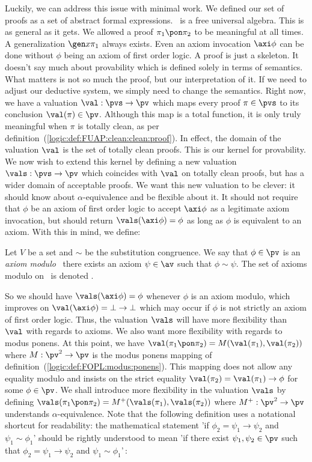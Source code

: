 Luckily, we can address this issue with minimal work. We defined our
set of proofs as a set of abstract formal expressions. \pvs\ is a
free universal algebra. This is as general as it gets. We allowed a
proof $\pi_{1}\pon\pi_{2}$ to be meaningful at all times. A
generalization $\gen x\pi_{1}$ always exists. Even an axiom
invocation $\axi\phi$ can be done without $\phi$ being an axiom of
first order logic. A proof is just a skeleton. It doesn't say much
about provability which is defined solely in terms of semantics.
What matters is not so much the proof, but our interpretation of it.
If we need to adjust our deductive system, we simply need to change
the semantics. Right now, we have a valuation $\val:\pvs\to\pv$
which maps every proof $\pi\in\pvs$ to its conclusion
$\val(\pi)\in\pv$. Although this map is a total function, it is only
truly meaningful when $\pi$ is totally clean, as per
definition~(\ref{logic:def:FUAP:clean:clean:proof}). In effect, the
domain of the valuation $\val$ is the set of totally clean proofs.
This is our kernel for provability. We now wish to extend this
kernel by defining a new valuation $\vals:\pvs\to\pv$ which
coincides with $\val$ on totally clean proofs, but has a wider
domain of acceptable proofs. We want this new valuation to be
clever: it should know about $\alpha$-equivalence and be flexible
about it. It should not require that $\phi$ be an axiom of first
order logic to accept $\axi\phi$ as a legitimate axiom invocation,
but should return $\vals(\axi\phi)=\phi$ as long as $\phi$ is
equivalent to an axiom. With this in mind, we define:

\begin{defin}\label{logic:def:FUAP:valuationmod:axiom:modulo}
Let $V$ be a set and $\sim$ be the substitution congruence. We say
that $\phi\in\pv$ is an {\em axiom modulo} \ifand\ there exists an
axiom $\psi\in\av$ such that $\phi\sim\psi$. The set of axioms
modulo on \pv\ is denoted \avs.
\end{defin}

So we should have $\vals(\axi\phi)=\phi$ whenever $\phi$ is an axiom
modulo, which improves on $\val(\axi\phi)=\bot\to\bot$ which may
occur if $\phi$ is not strictly an axiom of first order logic. Thus,
the valuation $\vals$ will have more flexibility than $\val$ with
regards to axioms. We also want more flexibility with regards to
modus ponens. At this point, we have
$\val(\pi_{1}\pon\pi_{2})=M(\val(\pi_{1}),\val(\pi_{2}))$ where
$M:\pv^{2}\to\pv$ is the modus ponens mapping of
definition~(\ref{logic:def:FOPL:modus:ponens}). This mapping does
not allow any equality modulo and insists on the strict equality
$\val(\pi_{2})=\val(\pi_{1})\to\phi$ for some $\phi\in\pv$. We shall
introduce more flexibility in the valuation $\vals$ by defining
$\vals(\pi_{1}\pon\pi_{2})=M^{+}(\vals(\pi_{1}),\vals(\pi_{2}))$
where $M^{+}:\pv^{2}\to\pv$ understands $\alpha$-equivalence. Note
that the following definition uses a notational shortcut for
readability: the mathematical statement 'if
$\phi_{2}=\psi_{1}\to\psi_{2}$ and $\psi_{1}\sim\phi_{1}$' should be
rightly understood to mean 'if there exist $\psi_{1},\psi_{2}\in\pv$
such that $\phi_{2}=\psi_{1}\to\psi_{2}$ and
$\psi_{1}\sim\phi_{1}$'\,:

